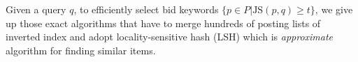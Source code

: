 

Given a query $q$, to efficiently select bid keywords
$\{p\in{}P\vert{}\text{JS}(p,q)\geq{}t\}$, we give up those exact algorithms that have
to merge hundreds of posting lists of inverted index and adopt
locality-sensitive hash (LSH) which is \emph{approximate} algorithm
for finding similar items.



